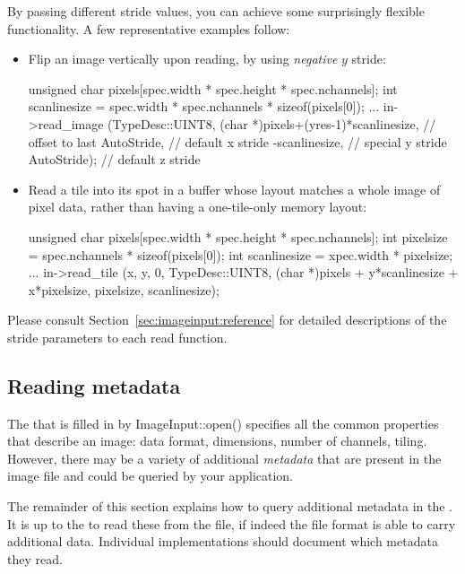 By passing different stride values, you can achieve some surprisingly
flexible functionality.  A few representative examples follow:

\begin{itemize}
\item Flip an image vertically upon reading, by using \emph{negative}
  $y$ stride:
  \begin{code}
    unsigned char pixels[spec.width * spec.height * spec.nchannels];
    int scanlinesize = spec.width * spec.nchannels * sizeof(pixels[0]);
    ...
    in->read_image (TypeDesc::UINT8,
                    (char *)pixels+(yres-1)*scanlinesize, // offset to last
                    AutoStride,                  // default x stride
                    -scanlinesize,               // special y stride
                    AutoStride);                 // default z stride
  \end{code}
\item Read a tile into its spot in a buffer whose layout matches
  a whole image of pixel data,
  rather than having a one-tile-only memory layout:
  \begin{code}
    unsigned char pixels[spec.width * spec.height * spec.nchannels];
    int pixelsize = spec.nchannels * sizeof(pixels[0]);
    int scanlinesize = xpec.width * pixelsize;
    ...
    in->read_tile (x, y, 0, TypeDesc::UINT8,
                   (char *)pixels + y*scanlinesize + x*pixelsize,
                   pixelsize,
                   scanlinesize);
  \end{code}
\end{itemize}

Please consult Section~\ref{sec:imageinput:reference} for detailed
descriptions of the stride parameters to each {\cf read} function.


\subsection{Reading metadata}
\label{sec:imageinput:metadata}

The \ImageSpec that is filled in by {\cf ImageInput::open()}
specifies all the common properties that describe an image: data format,
dimensions, number of channels, tiling.  However, there may be a variety
of additional \emph{metadata} that are present in the image file and
could be queried by your application.

The remainder of this section explains how to query additional metadata
in the \ImageSpec.  It is up to the \ImageInput to read these
from the file, if indeed the file format is able to carry additional
data.  Individual \ImageInput implementations should document which
metadata they read.

